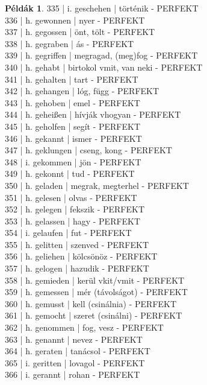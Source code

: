 \documentclass{article}
\theoremstyle{definition}
\newtheorem*{exmp}{Példák}
\begin{document}
\begin{exmp}
335 | i. geschehen | történik - PERFEKT\\
336 | h. gewonnen | nyer - PERFEKT\\
337 | h. gegossen | önt, tölt - PERFEKT\\
338 | h. gegraben | ás - PERFEKT\\
339 | h. gegriffen | megragad, (meg)fog - PERFEKT\\
340 | h. gehabt | birtokol vmit, van neki - PERFEKT\\
341 | h. gehalten | tart - PERFEKT\\
342 | h. gehangen | lóg, függ - PERFEKT\\
343 | h. gehoben | emel - PERFEKT\\
344 | h. geheißen | hívják vhogyan - PERFEKT\\
345 | h. geholfen | segít - PERFEKT\\
346 | h. gekannt | ismer - PERFEKT\\
347 | h. geklungen | cseng, kong - PERFEKT\\
348 | i. gekommen | jön - PERFEKT\\
349 | h. gekonnt | tud - PERFEKT\\
350 | h. geladen | megrak, megterhel - PERFEKT\\
351 | h. gelesen | olvas - PERFEKT\\
352 | h. gelegen | fekszik - PERFEKT\\
353 | h. gelassen | hagy - PERFEKT\\
354 | i. gelaufen | fut - PERFEKT\\
355 | h. gelitten | szenved - PERFEKT\\
356 | h. geliehen | kölcsönöz - PERFEKT\\
357 | h. gelogen | hazudik - PERFEKT\\
358 | h. gemieden | kerül vkit/vmit - PERFEKT\\
359 | h. gemessen | mér (távolságot) - PERFEKT\\
360 | h. gemusst | kell (csinálnia) - PERFEKT\\
361 | h. gemocht | szeret (csinálni) - PERFEKT\\
362 | h. genommen | fog, vesz - PERFEKT\\
363 | h. genannt | nevez - PERFEKT\\
364 | h. geraten | tanácsol - PERFEKT\\
365 | i. geritten | lovagol - PERFEKT\\
366 | i. gerannt | rohan - PERFEKT\\

\end{exmp}
\end{document}
